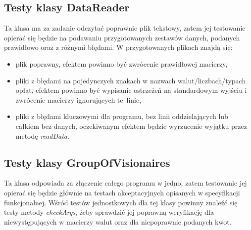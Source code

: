 \documentclass[a4paper,11pt]{article}
\newcommand\tab[1][0.6cm]{\hspace*{#1}}
\begin{document}
\subsection{Testy klasy DataReader}

\tab Ta klasa ma za zadanie odczytać poprawnie plik tekstowy, zatem jej testowanie opierać się będzie na podawaniu przygotowanych zestawów danych, podanych prawidłowo oraz z różnymi błędami. W przygotowanych plikach znajdą się:

\begin{itemize}
\item plik poprawny, efektem powinno być zwrócenie prawidłowej macierzy,
\item pliki z błędami na pojedynczych znakach w nazwach walut/liczbach/typach opłat, efektem powinno być wypisanie ostrzeżeń na standardowym wyjściu i zwrócenie macierzy ignorujących te~linie,
\item pliki z błędami kluczowymi dla programu, bez linii oddzielających lub całkiem bez danych, oczekiwanym efektem będzie wyrzucenie wyjątku przez metodę \textit{readData}.
\end{itemize}

\subsection{Testy klasy GroupOfVisionaires}

\tab Ta klasa odpowiada za złączenie całego programu w jedno, zatem testowanie jej opierać się będzie głównie na testach akceptacyjnych opisanych w specyfikacji funkcjonalnej. Wśród testów jednostkowych dla tej klasy powinny znaleźć się testy metody \textit{checkArgs}, żeby sprawdzić jej poprawną weryfikację dla niewystępujących w macierzy walut oraz dla niepoprawnie podanych kwot.
\end{document}
